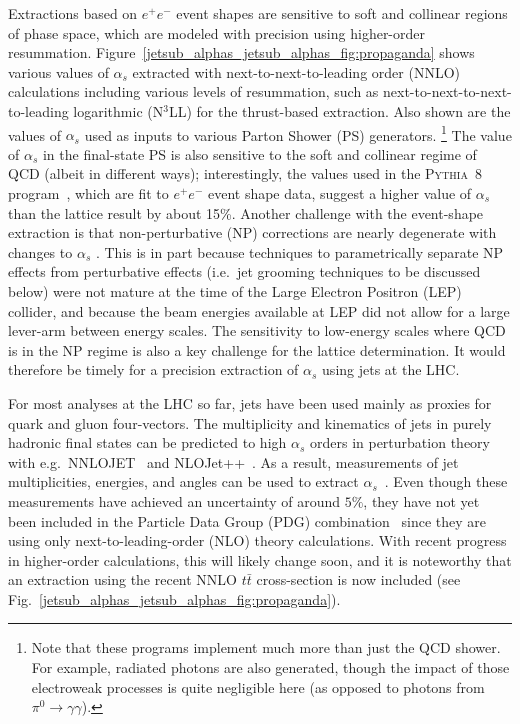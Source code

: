 \documentclass[11pt]{cernrep}
\begin{document}
Extractions based on $e^+e^-$ event shapes are sensitive to soft and collinear regions of phase space, which are modeled with precision
using higher-order resummation.
%
Figure~\ref{jetsub_alphas_jetsub_alphas_fig:propaganda} shows various values of $\alpha_s$ extracted with next-to-next-to-leading order (NNLO) calculations including various levels of resummation, such as next-to-next-to-next-to-leading logarithmic (N$^3$LL) for the thrust-based extraction.
%
Also shown are the values of $\alpha_s$ used as inputs to various Parton Shower (PS) generators.%
\footnote{Note that these programs implement much more than just the QCD shower.  For example, radiated photons are also generated, though the impact of those electroweak processes is quite negligible here (as opposed to photons from $\pi^0\rightarrow\gamma\gamma$).}
%
The value of $\alpha_s$ in the final-state PS is also sensitive to the soft and collinear regime of QCD (albeit in different ways); interestingly, the values used in the \textsc{Pythia~8} program~\cite{Sjostrand:2006za,Sjostrand:2007gs}, which are fit to $e^+e^-$ event shape data, suggest a higher value of $\alpha_s$ than the lattice result by about 15\%.
%
Another challenge with the event-shape extraction is that non-perturbative (NP) corrections are nearly degenerate with changes to $\alpha_s$ \cite{Abbate:2010xh}.
%
This is in part because techniques to parametrically separate NP effects from perturbative effects (i.e.~jet grooming techniques to be discussed below) were not mature at the time of the Large Electron Positron (LEP) collider, and because the beam energies available at LEP did not allow for a large lever-arm between energy scales.
%
The sensitivity to low-energy scales where QCD is in the NP regime is also a key challenge for the lattice determination.
%
It would therefore be timely for a precision extraction of $\alpha_s$ using jets at the LHC.

For most analyses at the LHC so far, jets have been used mainly as proxies for quark and gluon four-vectors.
%
The multiplicity and kinematics of jets in purely hadronic final states can be predicted to high $\alpha_s$ orders in perturbation theory with e.g.\ NNLOJET~\cite{Currie:2016bfm,Currie:2017ctp} and NLOJet++~\cite{Nagy:2001fj,Nagy:2003tz}.
%
As a result, measurements of jet multiplicities, energies, and angles can be used to extract $\alpha_s$~\cite{ATLAS:2015yaa,Aaboud:2017fml,Khachatryan:2014waa,CMS:2014mna,Chatrchyan:2013txa}.
%
Even though these measurements have achieved an uncertainty of around $5\%$, they have not yet been included in the Particle Data Group (PDG) combination~\cite{Olive:2016xmw} since they are using only next-to-leading-order (NLO) theory calculations.
%
With recent progress in higher-order calculations, this will likely change soon, and it is noteworthy that an extraction using the recent NNLO $t\bar{t}$ cross-section \cite{Czakon:2013goa} is now included (see Fig.~\ref{jetsub_alphas_jetsub_alphas_fig:propaganda}).
\end{document}
